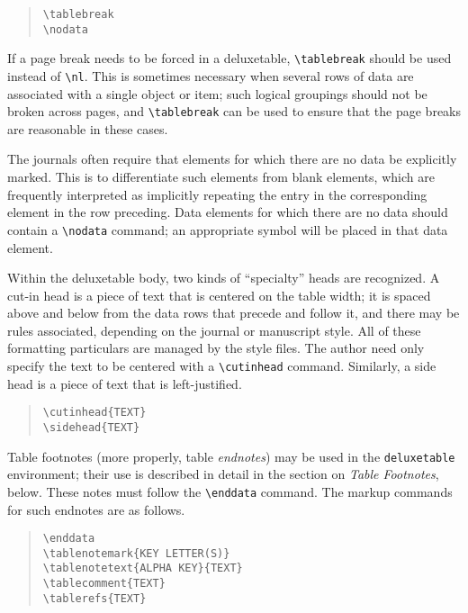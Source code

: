 \begin{quote}
\verb"\tablebreak"\\
\verb"\nodata"
\end{quote}

If a page break needs to be forced in a deluxetable,
\verb"\tablebreak" should be used instead of \verb"\nl".
This is sometimes necessary when several rows of data are
associated with a single object or item; such logical groupings
should not be broken across pages, and \verb"\tablebreak" can
be used to ensure that the page breaks are reasonable in these cases.

The journals often require that elements for which there are no data
be explicitly marked.  This is to differentiate such elements from
blank elements, which are frequently interpreted as implicitly
repeating the entry in the corresponding element in the row preceding.
Data elements for which there are no data should contain
a \verb"\nodata" command; an appropriate symbol will be placed in
that data element.

Within the deluxetable body, two kinds of ``specialty'' heads are
recognized.  A cut-in head is a piece of text that is centered on the 
table width;
it is spaced above and below from the data rows that precede and
follow it, and there may be rules associated, depending on the
journal or manuscript style.  All of these formatting particulars
are managed by the style files.  The author need only specify the
text to be centered with a \verb"\cutinhead" command.
Similarly, a side head is a piece of text that is left-justified.

\begin{quote}
\verb"\cutinhead{TEXT}"\\
\verb"\sidehead{TEXT}"
\end{quote}

Table footnotes (more properly, table {\sl endnotes\/})
may be used in the {\tt deluxetable} environment;
their use is described in detail in the section on
{\it Table Footnotes\/}, below.
These notes must follow the \verb"\enddata" command.
The markup commands for such endnotes are as follows.
\begin{quote}
\verb"\enddata"\\
\verb"\tablenotemark{KEY LETTER(S)}"\\
\verb"\tablenotetext{ALPHA KEY}{TEXT}"\\
\verb"\tablecomment{TEXT}"\\
\verb"\tablerefs{TEXT}"
\end{quote}


